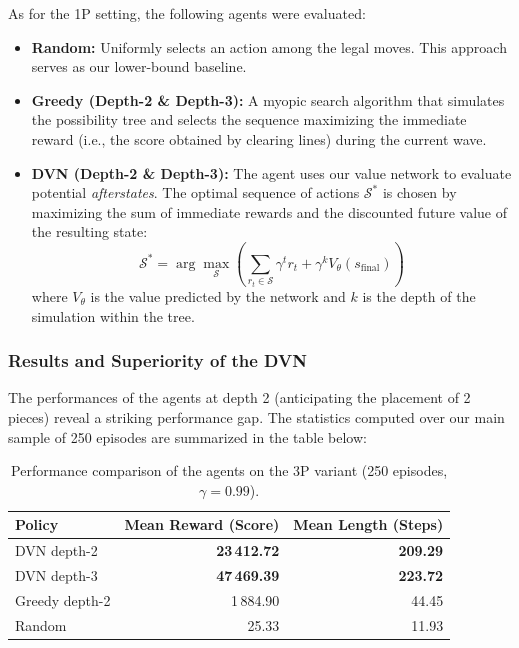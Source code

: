 \documentclass[10pt]{article}
\begin{document}
As for the 1P setting, the following agents were evaluated:
\begin{itemize}
    \item \textbf{Random:} Uniformly selects an action among the legal moves. This approach serves as our lower-bound baseline.
    \item \textbf{Greedy (Depth-2 \& Depth-3):} A myopic search algorithm that simulates the possibility tree and selects the sequence maximizing the immediate reward (i.e., the score obtained by clearing lines) during the current wave.
    \item \textbf{DVN (Depth-2 \& Depth-3):} The agent uses our value network to evaluate potential \emph{afterstates}. The optimal sequence of actions $\mathcal{S}^*$ is chosen by maximizing the sum of immediate rewards and the discounted future value of the resulting state:
    \begin{equation}
        \mathcal{S}^* = \arg\max_{\mathcal{S}} \left( \sum_{r_t \in \mathcal{S}} \gamma^t r_t + \gamma^k V_{\theta}(s_{\text{final}}) \right)
    \end{equation}
    where $V_{\theta}$ is the value predicted by the network and $k$ is the depth of the simulation within the tree.
\end{itemize}

\subsubsection{Results and Superiority of the DVN}

The performances of the agents at depth 2 (anticipating the placement of 2 pieces) reveal a striking performance gap. The statistics computed over our main sample of 250 episodes are summarized in the table below:

\begin{table}[H]
    \centering
    \begin{tabular}{lrr}
        \toprule
        \textbf{Policy} & \textbf{Mean Reward (Score)} & \textbf{Mean Length (Steps)} \\
        \midrule
        DVN depth-2 & \textbf{23\,412.72} & \textbf{209.29} \\
        DVN depth-3 & \textbf{47\,469.39} & \textbf{ 223.72} \\
        Greedy depth-2 & 1\,884.90 & 44.45 \\
        Random & 25.33 & 11.93 \\
        \bottomrule
    \end{tabular}
    \caption{Performance comparison of the agents on the 3P variant (250 episodes, $\gamma=0.99$).}
    \label{tab:benchmark_3p_main}
\end{table}
\end{document}
